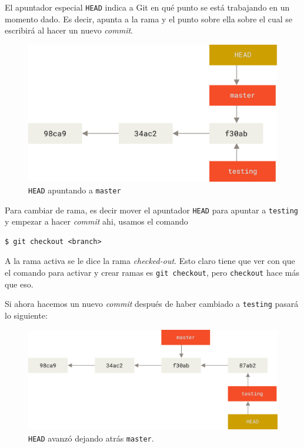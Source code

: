 \documentclass[spanish, 12pt, a4paper]{article}
\begin{document}
El apuntador especial \passthrough{\lstinline!HEAD!} indica a Git en qué
punto se está trabajando en un momento dado. Es decir, apunta a la rama
y el punto sobre ella sobre el cual se escribirá al hacer un nuevo
\emph{commit}.

\begin{figure}
\centering
\includegraphics{figs/head-to-master.png}
\caption{\passthrough{\lstinline!HEAD!} apuntando a
\passthrough{\lstinline!master!}}
\end{figure}

Para cambiar de rama, es decir mover el apuntador
\passthrough{\lstinline!HEAD!} para apuntar a
\passthrough{\lstinline!testing!} y empezar a hacer \emph{commit} ahi,
usamos el comando

\begin{lstlisting}
$ git checkout <branch>
\end{lstlisting}

A la rama activa se le dice la rama \emph{checked-out}. Esto claro tiene
que ver con que el comando para activar y crear ramas es
\passthrough{\lstinline!git checkout!}, pero
\passthrough{\lstinline!checkout!} hace más que eso.

Si ahora hacemos un nuevo \emph{commit} después de haber cambiado a
\passthrough{\lstinline!testing!} pasará lo siguiente:

\begin{figure}
\centering
\includegraphics{figs/advance-testing.png}
\caption{\passthrough{\lstinline!HEAD!} avanzó dejando atrás
\passthrough{\lstinline!master!}.}
\end{figure}
\end{document}
